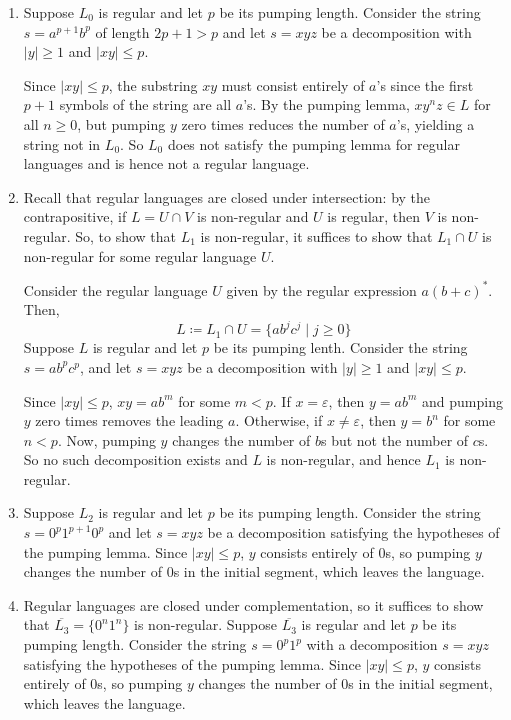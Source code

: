 \documentclass{article}
\theoremstyle{definition}
\theoremstyle{definition}
\theoremstyle{remark}
\begin{document}
\begin{enumerate}
    \item[$(i)$] Suppose $L_0$ is regular and let $p$ be its pumping length. Consider the string $s=a^{p+1}b^p$ of length $2p+1>p$ and let $s=xyz$ be a decomposition with $|y|\geq1$ and $|xy|\leq p$.

    Since $|xy|\leq p$, the substring $xy$ must consist entirely of $a$'s since the first $p+1$ symbols of the string are all $a$'s. By the pumping lemma, $xy^nz\in L$ for all $n\geq0$, but pumping $y$ zero times reduces the number of $a$'s, yielding a string not in $L_0$. So $L_0$ does not satisfy the pumping lemma for regular languages and is hence not a regular language.

    \item[$(ii)$] Recall that regular languages are closed under intersection: by the contrapositive, if $L=U\cap V$ is non-regular and $U$ is regular, then $V$ is non-regular. So, to show that $L_1$ is non-regular, it suffices to show that $L_1\cap U$ is non-regular for some regular language $U$.
    
    Consider the regular language $U$ given by the regular expression $a(b+c)^\ast$. Then,
    \begin{equation*}
        L\coloneqq L_1\cap U=\{ab^jc^j\mid j\geq0\}
    \end{equation*}
    Suppose $L$ is regular and let $p$ be its pumping lenth. Consider the string $s=ab^pc^p$, and let $s=xyz$ be a decomposition with $|y|\geq1$ and $|xy|\leq p$.
    
    Since $|xy|\leq p$, $xy=ab^m$ for some $m<p$. If $x=\varepsilon$, then $y=ab^m$ and pumping $y$ zero times removes the leading $a$. Otherwise, if $x\neq\varepsilon$, then $y=b^n$ for some $n<p$. Now, pumping $y$ changes the number of $b$s but not the number of $c$s. So no such decomposition exists and $L$ is non-regular, and hence $L_1$ is non-regular.

    \item[$(iii)$] Suppose $L_2$ is regular and let $p$ be its pumping length. Consider the string $s=0^p1^{p+1}0^p$ and let $s=xyz$ be a decomposition satisfying the hypotheses of the pumping lemma. Since $|xy|\leq p$, $y$ consists entirely of $0$s, so pumping $y$ changes the number of $0$s in the initial segment, which leaves the language.

    \item[$(iv)$] Regular languages are closed under complementation, so it suffices to show that $\overline{L_3}=\{0^n1^n\}$ is non-regular. Suppose $\overline{L_3}$ is regular and let $p$ be its pumping length. Consider the string $s=0^p1^p$ with a decomposition $s=xyz$ satisfying the hypotheses of the pumping lemma. Since $|xy|\leq p$, $y$ consists entirely of $0$s, so pumping $y$ changes the number of $0$s in the initial segment, which leaves the language.
\end{enumerate}
\end{document}
